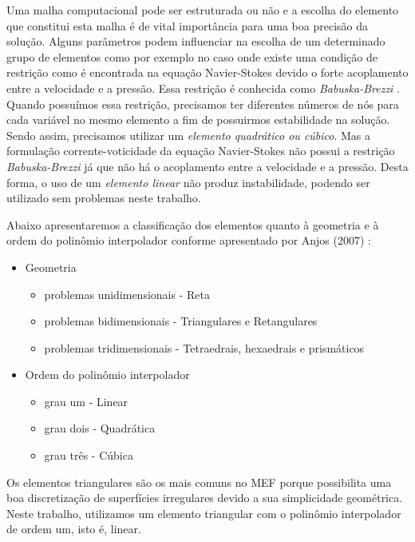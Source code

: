 Uma malha computacional pode ser estruturada ou não e 
a escolha do elemento que constitui esta malha é de vital
importância para uma boa precisão da solução. 
Alguns parâmetros podem influenciar na escolha de um
determinado grupo de elementos como por exemplo no caso onde existe uma condição
de restrição como é encontrada na equação Navier-Stokes devido
o forte acoplamento entre a velocidade e a pressão. Essa
restrição é conhecida como \textit{Babuska-Brezzi}
\cite{babuska1971}\cite{brezzi1974}.
Quando possuímos essa restrição, precisamos ter diferentes números de nós para cada
variável no mesmo elemento a fim de possuirmos estabilidade na
solução. Sendo assim, precisamos utilizar um \textit{elemento quadrático ou cúbico}.
Mas a formulação corrente-voticidade da equação Navier-Stokes não
possui a restrição \textit{Babuska-Brezzi} já que não há
o acoplamento entre a velocidade e a pressão. Desta forma,
o uso de um \textit{elemento linear} não produz instabilidade,
podendo ser utilizado sem problemas neste trabalho.

\medskip
Abaixo apresentaremos a classificação dos elementos quanto à geometria
e à ordem do polinômio interpolador conforme apresentado por Anjos (2007) \cite{anjos2007}:

\begin{itemize}
 \item Geometria
  \begin{itemize}
   \item problemas unidimensionais - Reta
   \item problemas bidimensionais - Triangulares e Retangulares 
   \item problemas tridimensionais - Tetraedrais, hexaedrais e prismáticos
  \end{itemize}
 \item Ordem do polinômio interpolador
  \begin{itemize}
   \item grau um - Linear
   \item grau dois - Quadrática
   \item grau três - Cúbica
  \end{itemize}
\end{itemize}

\medskip
Os elementos triangulares são os mais comuns no MEF porque possibilita
uma boa discretização de superfícies irregulares devido a sua 
simplicidade geométrica. Neste trabalho, utilizamos um elemento triangular
com o polinômio interpolador de ordem um, isto é, linear.

